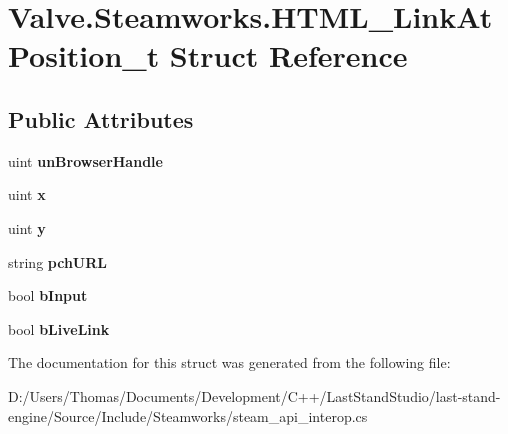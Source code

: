 \hypertarget{structValve_1_1Steamworks_1_1HTML__LinkAtPosition__t}{}\section{Valve.\+Steamworks.\+H\+T\+M\+L\+\_\+\+Link\+At\+Position\+\_\+t Struct Reference}
\label{structValve_1_1Steamworks_1_1HTML__LinkAtPosition__t}
\subsection*{Public Attributes}
\begin{DoxyCompactItemize}
\item 
\hypertarget{structValve_1_1Steamworks_1_1HTML__LinkAtPosition__t_ae21ce5ae6c7f0243e32277aa2e7a8103}{}uint {\bfseries un\+Browser\+Handle}\label{structValve_1_1Steamworks_1_1HTML__LinkAtPosition__t_ae21ce5ae6c7f0243e32277aa2e7a8103}

\item 
\hypertarget{structValve_1_1Steamworks_1_1HTML__LinkAtPosition__t_a99310745337d8e0983c579a830e85492}{}uint {\bfseries x}\label{structValve_1_1Steamworks_1_1HTML__LinkAtPosition__t_a99310745337d8e0983c579a830e85492}

\item 
\hypertarget{structValve_1_1Steamworks_1_1HTML__LinkAtPosition__t_a5f52d07dd7d02219e51e7987b6c1e1cc}{}uint {\bfseries y}\label{structValve_1_1Steamworks_1_1HTML__LinkAtPosition__t_a5f52d07dd7d02219e51e7987b6c1e1cc}

\item 
\hypertarget{structValve_1_1Steamworks_1_1HTML__LinkAtPosition__t_a5f10d59a3a5869a639be664d66247754}{}string {\bfseries pch\+U\+R\+L}\label{structValve_1_1Steamworks_1_1HTML__LinkAtPosition__t_a5f10d59a3a5869a639be664d66247754}

\item 
\hypertarget{structValve_1_1Steamworks_1_1HTML__LinkAtPosition__t_a4659d60caf1048b8027523b300481617}{}bool {\bfseries b\+Input}\label{structValve_1_1Steamworks_1_1HTML__LinkAtPosition__t_a4659d60caf1048b8027523b300481617}

\item 
\hypertarget{structValve_1_1Steamworks_1_1HTML__LinkAtPosition__t_ace15f3cd4ab6d84dfcc4c3027104314f}{}bool {\bfseries b\+Live\+Link}\label{structValve_1_1Steamworks_1_1HTML__LinkAtPosition__t_ace15f3cd4ab6d84dfcc4c3027104314f}

\end{DoxyCompactItemize}


The documentation for this struct was generated from the following file\+:\begin{DoxyCompactItemize}
\item 
D\+:/\+Users/\+Thomas/\+Documents/\+Development/\+C++/\+Last\+Stand\+Studio/last-\/stand-\/engine/\+Source/\+Include/\+Steamworks/steam\+\_\+api\+\_\+interop.\+cs\end{DoxyCompactItemize}
